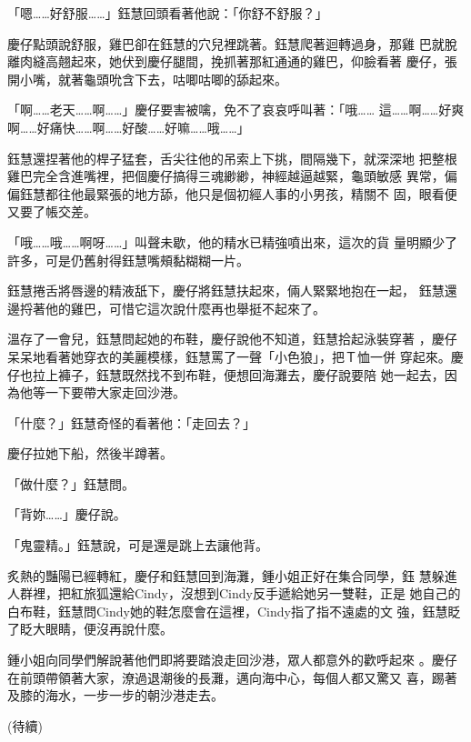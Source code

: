 「嗯……好舒服……」鈺慧回頭看著他說：「你舒不舒服？」

慶仔點頭說舒服，雞巴卻在鈺慧的穴兒裡跳著。鈺慧爬著迴轉過身，那雞
巴就脫離肉縫高翹起來，她伏到慶仔腿間，挽抓著那紅通通的雞巴，仰臉看著
慶仔，張開小嘴，就著龜頭吮含下去，咕唧咕唧的舔起來。

「啊……老天……啊……」慶仔要害被噙，免不了哀哀呼叫著：「哦……
這……啊……好爽啊……好痛快……啊……好酸……好嘛……哦……」

鈺慧還捏著他的桿子猛套，舌尖往他的吊索上下挑，間隔幾下，就深深地
把整根雞巴完全含進嘴裡，把個慶仔搞得三魂緲緲，神經越逼越緊，龜頭敏感
異常，偏偏鈺慧都往他最緊張的地方舔，他只是個初經人事的小男孩，精關不
固，眼看便又要了帳交差。

「哦……哦……啊呀……」叫聲未歇，他的精水已精強噴出來，這次的貨
量明顯少了許多，可是仍舊射得鈺慧嘴頰黏糊糊一片。

鈺慧捲舌將唇邊的精液舐下，慶仔將鈺慧扶起來，倆人緊緊地抱在一起，
鈺慧還邊捋著他的雞巴，可惜它這次說什麼再也舉挺不起來了。

溫存了一會兒，鈺慧問起她的布鞋，慶仔說他不知道，鈺慧拾起泳裝穿著
，慶仔呆呆地看著她穿衣的美麗模樣，鈺慧罵了一聲「小色狼」，把Ｔ恤一併
穿起來。慶仔也拉上褲子，鈺慧既然找不到布鞋，便想回海灘去，慶仔說要陪
她一起去，因為他等一下要帶大家走回沙港。

「什麼？」鈺慧奇怪的看著他：「走回去？」

慶仔拉她下船，然後半蹲著。

「做什麼？」鈺慧問。

「背妳……」慶仔說。

「鬼靈精。」鈺慧說，可是還是跳上去讓他背。

炙熱的豔陽已經轉紅，慶仔和鈺慧回到海灘，鍾小姐正好在集合同學，鈺
慧躲進人群裡，把紅旅狐還給Cindy，沒想到Cindy反手遞給她另一雙鞋，正是
她自己的白布鞋，鈺慧問Cindy她的鞋怎麼會在這裡，Cindy指了指不遠處的文
強，鈺慧眨了眨大眼睛，便沒再說什麼。

鍾小姐向同學們解說著他們即將要踏浪走回沙港，眾人都意外的歡呼起來
。慶仔在前頭帶領著大家，潦過退潮後的長灘，邁向海中心，每個人都又驚又
喜，踢著及膝的海水，一步一步的朝沙港走去。

(待續)










